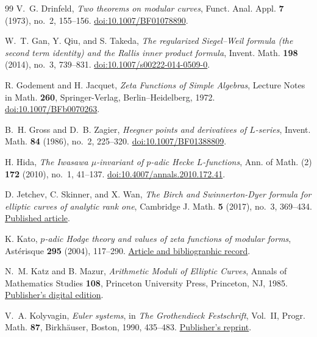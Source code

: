 \begin{thebibliography}{99}
V.~G. Drinfeld,
\emph{Two theorems on modular curves},
Funct. Anal. Appl. \textbf{7} (1973), no.~2, 155--156.
\href{https://doi.org/10.1007/BF01078890}{doi:10.1007/BF01078890}.

W.~T. Gan, Y. Qiu, and S. Takeda,
\emph{The regularized Siegel--Weil formula (the second term identity)
and the Rallis inner product formula},
Invent. Math. \textbf{198} (2014), no.~3, 739--831.
\href{https://doi.org/10.1007/s00222-014-0509-0}{doi:10.1007/s00222-014-0509-0}.

R. Godement and H. Jacquet,
\emph{Zeta Functions of Simple Algebras},
Lecture Notes in Math. \textbf{260}, Springer-Verlag,
Berlin--Heidelberg, 1972.
\href{https://doi.org/10.1007/BFb0070263}{doi:10.1007/BFb0070263}.

B.~H. Gross and D.~B. Zagier,
\emph{Heegner points and derivatives of $L$-series},
Invent. Math. \textbf{84} (1986), no.~2, 225--320.
\href{https://doi.org/10.1007/BF01388809}{doi:10.1007/BF01388809}.

H. Hida,
\emph{The Iwasawa $\mu$-invariant of $p$-adic Hecke $L$-functions},
Ann. of Math. (2) \textbf{172} (2010), no.~1, 41--137.
\href{https://doi.org/10.4007/annals.2010.172.41}{doi:10.4007/annals.2010.172.41}.

D. Jetchev, C. Skinner, and X. Wan,
\emph{The Birch and Swinnerton-Dyer formula for elliptic curves
of analytic rank one},
Cambridge J. Math. \textbf{5} (2017), no.~3, 369--434.
\href{https://archive.intlpress.com/site/pub/files/_fulltext/journals/cjm/2017/0005/0003/CJM-2017-0005-0003-a002.pdf}{Published article}.

K. Kato,
\emph{$p$-adic Hodge theory and values of zeta functions of modular forms},
Ast\'erisque \textbf{295} (2004), 117--290.
\href{https://www.numdam.org/item/AST_2004__295__117_0/}{Article and bibliographic record}.

N.~M. Katz and B. Mazur,
\emph{Arithmetic Moduli of Elliptic Curves},
Annals of Mathematics Studies \textbf{108},
Princeton University Press, Princeton, NJ, 1985.
\href{https://doi.org/10.1515/9781400881710}{Publisher's digital edition}.

V.~A. Kolyvagin,
\emph{Euler systems},
in \emph{The Grothendieck Festschrift}, Vol.~II,
Progr. Math. \textbf{87}, Birkh\"auser, Boston, 1990, 435--483.
\href{https://doi.org/10.1007/978-0-8176-4575-5_11}{Publisher's reprint}.


\end{thebibliography}
